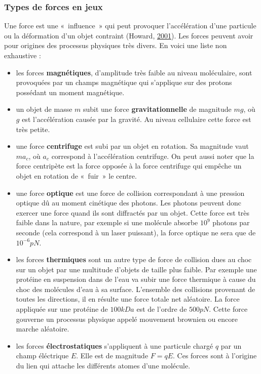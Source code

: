 \documentclass[12pt,a4paper,twoside,openright]{book}
\begin{document}
\subsubsection{Types de forces en jeux}\label{types-de-forces-en-jeux}

Une force est une «~influence~» qui peut provoquer l'accélération d'une
particule ou la déformation d'un objet contraint (Howard,
\protect\hyperlink{ref-Howard2001}{2001}). Les forces peuvent avoir pour
origines des processus physiques très divers. En voici une liste non
exhaustive :

\begin{itemize}
\item
  les forces \textbf{magnétiques}, d'amplitude très faible au niveau
  moléculaire, sont provoquées par un champs magnétique qui s'applique
  sur des protons possédant un moment magnétique.
\item
  un objet de masse \(m\) subit une force \textbf{gravitationnelle} de
  magnitude \(mg\), où \(g\) est l'accélération causée par la gravité.
  Au niveau cellulaire cette force est très petite.
\item
  une force \textbf{centrifuge} est subi par un objet en rotation. Sa
  magnitude vaut \(ma_c\), où \(a_c\) correspond à l'accélération
  centrifuge. On peut aussi noter que la force centripète est la force
  opposée à la force centrifuge qui empêche un objet en rotation de
  «~fuir~» le centre.
\item
  une force \textbf{optique} est une force de collision correspondant à
  une pression optique dû au moment cinétique des photons. Les photons
  peuvent donc exercer une force quand ils sont diffractés par un objet.
  Cette force est très faible dans la nature, par exemple si une
  molécule absorbe \(10^9\) photons par seconde (cela correspond à un
  laser puissant), la force optique ne sera que de \(10^{-6}pN\).
\item
  les forces \textbf{thermiques} sont un autre type de force de
  collision dues au choc sur un objet par une multitude d'objets de
  taille plus faible. Par exemple une protéine en suspension dans de
  l'eau va subir une force thermique à cause du choc des molécules d'eau
  à sa surface. L'ensemble des collisions provenant de toutes les
  directions, il en résulte une force totale net aléatoire. La force
  appliquée sur une protéine de \(100kDa\) est de l'ordre de \(500pN\).
  Cette force gouverne un processus physique appelé mouvement brownien
  ou encore marche aléatoire.
\item
  les forces \textbf{électrostatiques} s'appliquent à une particule
  chargé \(q\) par un champ éléctrique \(E\). Elle est de magnitude
  \(F = qE\). Ces forces sont à l'origine du lien qui attache les
  différents atomes d'une molécule.
\end{itemize}
\end{document}
